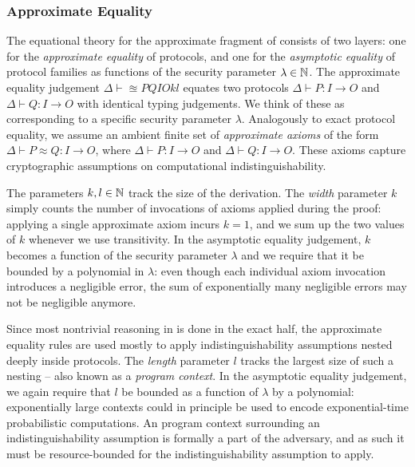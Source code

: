 \subsubsection{Approximate Equality}
The equational theory for the approximate fragment of \ipdl consists of two layers: one for the \emph{approximate equality} of protocols, and one for the \emph{asymptotic equality} of protocol families as functions of the security parameter $\lambda \in \mathbb{N}$. The approximate equality judgement $\Delta \vdash \approxeq{P}{Q}{I}{O}{k}{l}$ equates two protocols $\Delta \vdash P : I \to O$ and $\Delta \vdash Q : I \to O$ with identical typing judgements. We think of these as corresponding to a specific security parameter $\lambda$. Analogously to exact protocol equality, we assume an ambient finite set of \emph{approximate axioms} of the form $\Delta \vdash P \approx Q : I \to O$, where $\Delta \vdash P : I \to O$ and $\Delta \vdash Q : I \to O$. These axioms capture cryptographic assumptions on computational indistinguishability.

The parameters $k, l \in \mathbb{N}$ track the size of the derivation. The \emph{width} parameter $k$ simply counts the number of invocations of axioms applied during the proof: applying a single approximate axiom incurs $k = 1$, and we sum up the two values of $k$ whenever we use transitivity. In the asymptotic equality judgement, $k$ becomes a function of the security parameter $\lambda$ and we require that it be bounded by a polynomial in $\lambda$: even though each individual axiom invocation introduces a negligible error, the sum of exponentially many negligible errors may not be negligible anymore.

Since most nontrivial reasoning in \ipdl is done in the exact half, the approximate equality rules are used mostly to apply indistinguishability assumptions nested deeply inside protocols. The \emph{length} parameter $l$ tracks the largest size of such a nesting -- also known as a \emph{program context}. In the asymptotic equality judgement, we again require that $l$ be bounded as a function of $\lambda$ by a polynomial: exponentially large \ipdl contexts could in principle be used to encode exponential-time probabilistic computations. An \ipdl program context surrounding an indistinguishability assumption is formally a part of the adversary, and as such it must be resource-bounded for the indistinguishability assumption to apply.

